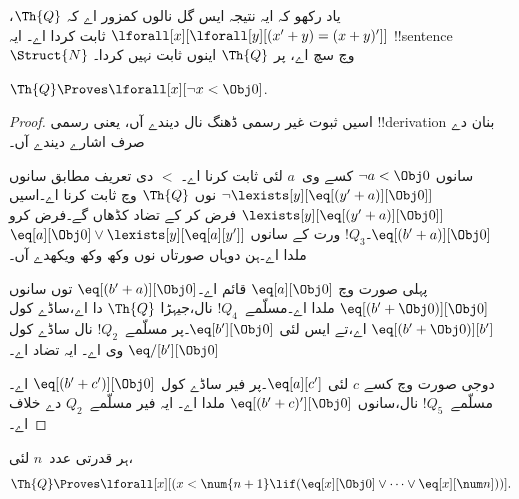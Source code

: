 \documentclass[../../../include/open-logic-section]{subfiles}
\begin{document}
یاد رکھو کہ ایہ نتیجہ ایس گل نالوں کمزور اے کہ
$\Th{Q}$، $\lforall[x][\lforall[y][(x' + y) = (x + y)']]$ ثابت کردا اے۔
ایہ !!{sentence}~$\Struct{N}$ وچ سچ اے، پر $\Th{Q}$ اینوں
ثابت نہیں کردا۔

\begin{lem}
$\Th{Q} \Proves \lforall[x][\lnot x < \Obj 0]$.
\end{lem}

\begin{proof}
اسیں ثبوت غیر رسمی ڈھنگ نال دیندے آں، یعنی رسمی !!{derivation} بنان دے صرف اشارے دیندے آں۔

سانوں $\lnot a < \Obj 0$ کسے وی~$a$ لئی ثابت کرنا اے۔ $<$
دی تعریف مطابق سانوں $\lnot
\lexists[y][\eq[(y'+a)][\Obj 0]]$ نوں $\Th{Q}$ وچ ثابت کرنا اے۔اسیں $\lexists[y][\eq[(y'+a)][\Obj 0]]$ فرض کر کے تضاد کڈھاں گے۔فرض کرو
$\eq[(b'+a)][\Obj 0]$۔$!Q_3$ ورت کے سانوں
$\eq[a][\Obj 0] \lor \lexists[y][\eq[a][y']]$ ملدا اے۔ہن دوہاں صورتاں نوں وکھ وکھ ویکھدے آں۔

پہلی صورت وچ $\eq[a][\Obj 0]$ قائم اے۔$\eq[(b'+a)][\Obj 0]$ توں سانوں
$\eq[(b' + \Obj 0)][\Obj 0]$ ملدا اے۔مسلّمے~$!Q_4$ نال،جیہڑا $\Th{Q}$ دا اے،ساڈے کول
$\eq[(b' + \Obj 0)][b']$ اے،تے ایس لئی $\eq[b'][\Obj 0]$۔پر
مسلّمے~$!Q_2$ نال ساڈے کول $\eq/[b'][\Obj 0]$ وی اے۔ ایہ تضاد اے۔

دوجی صورت وچ کسے $c$ لئی $\eq[a][c']$۔پر فیر ساڈے کول $\eq[(b' +
c')][\Obj 0]$ اے۔مسلّمے~$!Q_5$ نال،سانوں $\eq[(b' + c)'][\Obj 0]$ ملدا اے۔ ایہ فیر مسلّمے~$Q_2$ دے خلاف اے۔
\end{proof}

\begin{lem}
ہر قدرتی عدد~$n$ لئی،
  \[
  \Th{Q} \Proves
  \lforall[x][(x < \num {n+1} \lif (\eq[x][\Obj 0] \lor \dots \lor
    \eq[x][\num n]))].
  \]
\end{lem}
\end{document}
